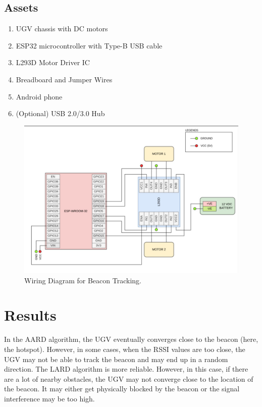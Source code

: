 \documentclass[conference]{IEEEtran}
\begin{document}
\subsection{Assets}
\begin{enumerate}
    \item UGV chassis with DC motors
    \item ESP32 microcontroller with Type-B USB cable
    \item L293D Motor Driver IC
    \item Breadboard and Jumper Wires
    \item Android phone
    \item (Optional) USB 2.0/3.0 Hub
\end{enumerate}


\begin{figure}[t]
    \centering
    \includegraphics[width=\columnwidth]{beacon.jpg}
    \caption{Wiring Diagram for Beacon Tracking.}
    \label{fig:beacon}
\end{figure}

\section{Results}
\label{sec:results}
In the AARD algorithm, the UGV eventually converges close to the beacon (here,
the hotspot). However, in some cases, when the RSSI values are too close, the
UGV may not be able to track the beacon and may end up in a random direction.
The LARD algorithm is more reliable.  However,  in this case, if there are a lot
of nearby obstacles, the UGV may not converge close to the location of the
beacon. It may either get physically blocked by the beacon or the signal
interference may be too high.
\end{document}
